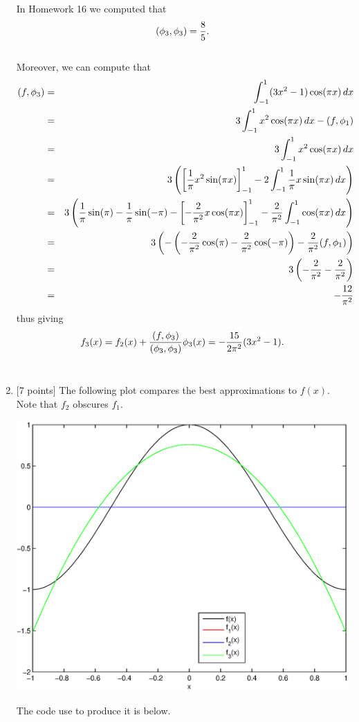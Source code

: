 \begin{solution}
\begin{enumerate}
In Homework 16 we computed that
\[
  (\phi_3,\phi_3) = {8\over 5}.
\]
\\
Moreover, we can compute that
\begin{eqnarray*}
  (f,\phi_3) &=& \int_{-1}^1 (3x^2-1)\cos(\pi x)\,dx
\\
 &=& 3\int_{-1}^1 x^2\cos(\pi x)\,dx-(f,\phi_1)
\\
 &=& 3\int_{-1}^1 x^2\cos(\pi x)\,dx
\\
 &=& 3\left(\left[\frac{1}{\pi}x^2\sin(\pi x)\right]_{-1}^1-2\int_{-1}^1 \frac{1}{\pi}x\sin(\pi x)\,dx\right)
\\
 &=& 3\left(\frac{1}{\pi}\sin(\pi)-\frac{1}{\pi}\sin(-\pi)-\left[-\frac{2}{\pi^2}x\cos(\pi x)\right]_{-1}^1-\frac{2}{\pi^2}\int_{-1}^1 \cos(\pi x)\,dx\right)
\\
 &=& 3\left(-\left(-\frac{2}{\pi^2}\cos(\pi )-\frac{2}{\pi^2}\cos(-\pi)\right)-\frac{2}{\pi^2}(f,\phi_1)\right)
\\
 &=& 3\left(-\frac{2}{\pi^2}-\frac{2}{\pi^2}\right)
\\
 &=& -\frac{12}{\pi^2}
\end{eqnarray*}
thus giving
       \[ f_3(x) = f_2(x) + {(f,\phi_3) \over (\phi_3, \phi_3)} \phi_3(x) = -\frac{15}{2\pi^2} (3x^2-1) .\]
\\
\item {[7 points]} The following plot compares the best approximations to $f(x)$. Note that $f_2$ obscures $f_1$.

\begin{center} \includegraphics[scale=0.5]{hw17d} \end{center}

The code use to produce it is below.


\end{enumerate}
\end{solution}

